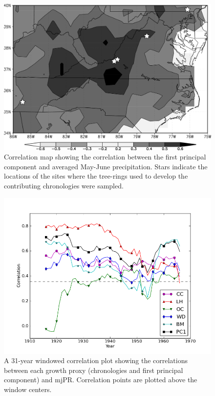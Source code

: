 \begin{figure}
\centering
\includegraphics[width=5in]{figures/corrMapPrecipMJ_bw_annot.png}
\caption{Correlation map showing the correlation between the first principal component and averaged May-June precipitation. Stars indicate the locations of the sites where the tree-rings used to develop the contributing chronologies were sampled.}
\label{fig:precipCorrMap}
\end{figure}

%

\begin{figure}
\centering
\includegraphics[width=5in]{figures/precipRunningCorr.png}
\caption{A 31-year windowed correlation plot showing the correlations between each growth proxy (chronologies and first principal component) and mjPR. Correlation points are plotted above the window centers.}
\label{fig:precipRunningCorr}
\end{figure}

